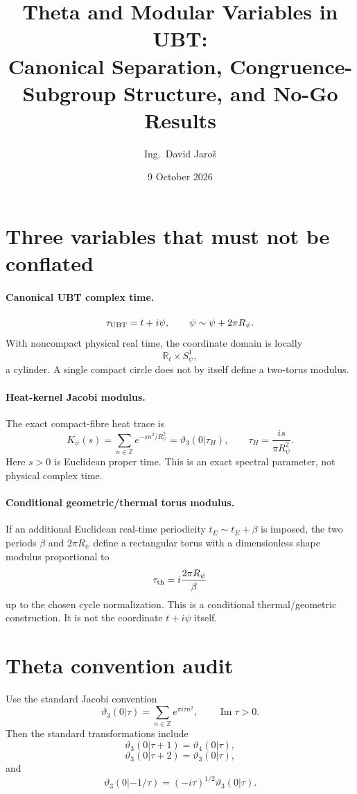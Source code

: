\documentclass[11pt,a4paper]{article}
\title{Theta and Modular Variables in UBT:\\
Canonical Separation, Congruence-Subgroup Structure, and No-Go Results}
\author{Ing.\ David Jaro\v{s}}
\date{9 October 2026}
\begin{document}
\maketitle

\section{Three variables that must not be conflated}

\paragraph{Canonical UBT complex time.}
\[
 \tau_{\rm UBT}=t+i\psi,
 \qquad \psi\sim\psi+2\pi R_\psi .
\]
With noncompact physical real time, the coordinate domain is locally
\[
 \mathbb R_t\times S^1_\psi,
\]
a cylinder.  A single compact circle does not by itself define a two-torus
modulus.

\paragraph{Heat-kernel Jacobi modulus.}
The exact compact-fibre heat trace is
\[
 K_\psi(s)=\sum_{n\in\mathbb Z}e^{-s n^2/R_\psi^2}
 =\vartheta_3(0|\tau_H),
 \qquad
 \boxed{\tau_H=\frac{i s}{\pi R_\psi^2}}.
\]
Here $s>0$ is Euclidean proper time.  This is an exact spectral parameter,
not physical complex time.

\paragraph{Conditional geometric/thermal torus modulus.}
If an additional Euclidean real-time periodicity
$t_E\sim t_E+\beta$ is imposed, the two periods
$\beta$ and $2\pi R_\psi$ define a rectangular torus with a dimensionless
shape modulus proportional to
\[
 \tau_{\rm th}=i\frac{2\pi R_\psi}{\beta}
\]
up to the chosen cycle normalization.  This is a conditional thermal/geometric
construction.  It is not the coordinate $t+i\psi$ itself.

\section{Theta convention audit}

Use the standard Jacobi convention
\[
 \vartheta_3(0|\tau)
 =\sum_{n\in\mathbb Z}e^{\pi i\tau n^2},
 \qquad \operatorname{Im}\tau>0.
\]
Then the standard transformations include
\[
 \boxed{\vartheta_3(0|\tau+1)=\vartheta_4(0|\tau),}
\]
\[
 \boxed{\vartheta_3(0|\tau+2)=\vartheta_3(0|\tau),}
\]
and
\[
 \boxed{
 \vartheta_3(0|-1/\tau)
 =(-i\tau)^{1/2}\vartheta_3(0|\tau)
 }.
\]
\end{document}
